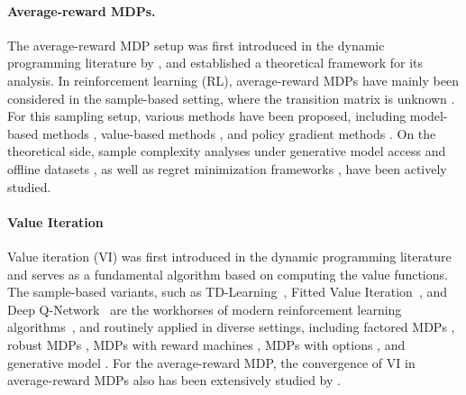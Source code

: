 \documentclass{article}
\theoremstyle{definition}
\theoremstyle{remark}
\begin{document}
\paragraph{Average-reward MDPs.}
The average-reward MDP setup was first introduced in the dynamic programming literature by \cite{howard1960dynamic}, and \cite{blackwell1962discrete} established a theoretical framework for its analysis. In reinforcement learning (RL), average-reward MDPs have mainly been considered in the sample-based setting, where the transition matrix is unknown \citep{mahadevan1996average}. For this sampling setup, various methods have been proposed, including model-based methods \citep{jin2021towards, tuynman2024finding, zurek2024span}, value-based methods \citep{wan2024convergence, bravo2024stochastic, chen2025non}, and policy gradient methods \citep{bai2024regret,murthy2023convergence, kumar2024global}. On the theoretical side, sample complexity analyses under generative model access \citep{wang2017primal, zhang2023sharper, li2025stochastic, jin2024feasible, lee2025near} and offline datasets \citep{ozdaglar2024, gabbianelli2024offline, zurek2025optimal, lee2025finite}, as well as regret minimization frameworks \citep{burnetas1997optimal, Jaksch2010, zhang2019regret, boone2024achieving}, have been actively studied.


\paragraph{Value Iteration}
Value iteration (VI) was first introduced in the dynamic programming literature \cite{bellman1957Markovian} and serves as a fundamental algorithm based on computing the value functions. The sample-based variants, such as TD-Learning~\cite{Sutton1988}, Fitted Value Iteration~\cite{ernst2005tree,munos2008finite}, and Deep Q-Network~\cite{MnihKavukcuogluSilveretal2015} are the workhorses of modern reinforcement learning algorithms~\cite{Bertsekas96,sutton2018reinforcement,SzepesvariBook10}, and routinely applied in diverse settings, including factored MDPs \cite{rosenberg2021oracle}, robust MDPs \cite{kumarefficient}, MDPs with reward machines \cite{bourel2023exploration}, MDPs with options \cite{fruit2017regret}, and generative model  \cite{wainwright2019variance, sidford2023variance, lee2025near}. For the average-reward MDP, the convergence of VI in average-reward MDPs also has been extensively studied by \citep{seneta2006non, hubner1977improved,federgruen1978contraction, van1981stochastic, della2012illustrated, schweitzer1977asymptotic, schweitzer1979geometric}.  
\end{document}
